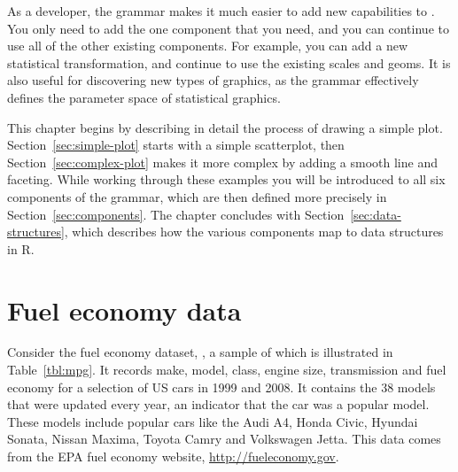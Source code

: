 As a developer, the grammar makes it much easier to add new capabilities to \ggplot. You only need to add the one component that you need, and you can continue to use all of the other existing components.  For example, you can add a new statistical transformation, and continue to use the existing scales and geoms.  It is also useful for discovering new types of graphics, as the grammar effectively defines the parameter space of statistical graphics.

This chapter begins by describing in detail the process of drawing a simple plot.  Section~\ref{sec:simple-plot} starts with a simple scatterplot, then Section~\ref{sec:complex-plot} makes it more complex by adding a smooth line and faceting.  While working through these examples you will be introduced to all six components of the grammar, which are then defined more precisely in Section~\ref{sec:components}.  The chapter concludes with Section~\ref{sec:data-structures}, which describes how the various components map to data structures in R.  

\section{Fuel economy data}
\label{sec:fuel_economy_data}

Consider the fuel economy dataset, , a sample of which is illustrated in Table~\ref{tbl:mpg}. It records make, model, class, engine size, transmission and fuel economy for a selection of US cars in 1999 and 2008. It contains the 38 models that were updated every year, an indicator that the car was a popular model. These models include popular cars like the Audi A4, Honda Civic, Hyundai Sonata, Nissan Maxima, Toyota Camry and Volkswagen Jetta. This data comes from the EPA fuel economy website, \url{http://fueleconomy.gov}.

